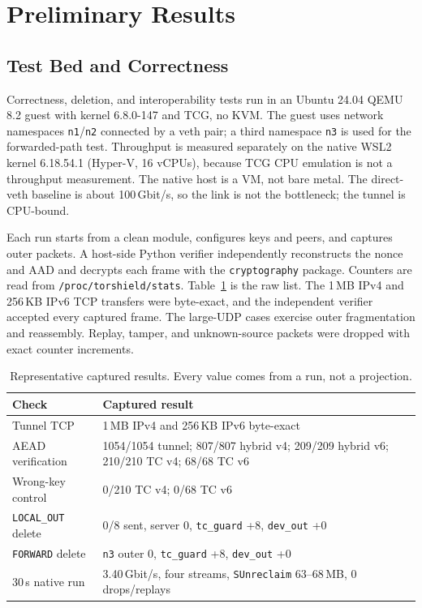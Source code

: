 \documentclass[conference]{IEEEtran}
\newcommand{\code}[1]{\texttt{#1}}
\begin{document}
\section{Preliminary Results}
\subsection{Test Bed and Correctness}
Correctness, deletion, and interoperability tests run in an Ubuntu 24.04 QEMU 8.2 guest with kernel 6.8.0-147 and TCG, no KVM. The guest uses network namespaces \code{n1}/\code{n2} connected by a veth pair; a third namespace \code{n3} is used for the forwarded-path test. Throughput is measured separately on the native WSL2 kernel 6.18.54.1 (Hyper-V, 16 vCPUs), because TCG CPU emulation is not a throughput measurement. The native host is a VM, not bare metal. The direct-veth baseline is about 100\,Gbit/s, so the link is not the bottleneck; the tunnel is CPU-bound.

Each run starts from a clean module, configures keys and peers, and captures outer packets. A host-side Python verifier independently reconstructs the nonce and AAD and decrypts each frame with the \code{cryptography} package. Counters are read from \code{/proc/torshield/stats}. Table~\ref{tab:results} is the raw list. The 1\,MB IPv4 and 256\,KB IPv6 TCP transfers were byte-exact, and the independent verifier accepted every captured frame. The large-UDP cases exercise outer fragmentation and reassembly. Replay, tamper, and unknown-source packets were dropped with exact counter increments.

\begin{table}[t]
\centering
\caption{Representative captured results. Every value comes from a run, not a projection.}
\label{tab:results}
\footnotesize
\setlength{\tabcolsep}{2.5pt}
\begin{tabular}{@{}p{}p{}@{}}
\toprule
Check & Captured result \\
\midrule
Tunnel TCP & 1\,MB IPv4 and 256\,KB IPv6 byte-exact \\
AEAD verification & 1054/1054 tunnel; 807/807 hybrid v4; 209/209 hybrid v6; 210/210 TC v4; 68/68 TC v6 \\
Wrong-key control & 0/210 TC v4; 0/68 TC v6 \\
\code{LOCAL\_OUT} delete & 0/8 sent, server 0, \code{tc\_guard} +8, \code{dev\_out} +0 \\
\code{FORWARD} delete & \code{n3} outer 0, \code{tc\_guard} +8, \code{dev\_out} +0 \\
30\,s native run & 3.40\,Gbit/s, four streams, \code{SUnreclaim} 63--68\,MB, 0 drops/replays \\
\bottomrule
\end{tabular}
\end{table}
\end{document}
